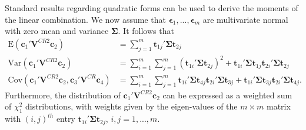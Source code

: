 \documentclass[12pt]{article}
\newcommand{\E}{\text{E}}
\newcommand{\Cov}{\text{Cov}}
\newcommand{\Var}{\text{Var}}
\newcommand{\bm}{\mathbf}
\newcommand{\bs}{\boldsymbol}
\begin{document}
Standard results regarding quadratic forms can be used to derive the moments of the linear combination. We now assume that $\bs\epsilon_1,...,\bs\epsilon_m$ are multivariate normal with zero mean and variance $\bs\Sigma$. It follows that 
\begin{align}
\label{eq:CRVE_expectation}
\E\left(\bm{c}_1' \bm{V}^{CR2} \bm{c}_2\right) &= \sum_{j=1}^m \bm{t}_{1j}' \bs\Sigma \bm{t}_{2j} \\
\label{eq:CRVE_variance}
\Var\left(\bm{c}_1' \bm{V}^{CR2} \bm{c}_2\right) &= \sum_{i=1}^m \sum_{j=1}^m \left(\bm{t}_{1i}' \bs\Sigma \bm{t}_{2j}\right)^2 + \bm{t}_{1i}' \bs\Sigma \bm{t}_{1j} \bm{t}_{2i}' \bs\Sigma \bm{t}_{2j} \\
\label{eq:CRVE_covariance}
\Cov\left(\bm{c}_1' \bm{V}^{CR2} \bm{c}_2, \bm{c}_3' \bm{V}^{CR} \bm{c}_4\right) &= \sum_{i=1}^m \sum_{j=1}^m \bm{t}_{1i}' \bs\Sigma \bm{t}_{4j} \bm{t}_{2i}' \bs\Sigma \bm{t}_{3j} + \bm{t}_{1i}' \bs\Sigma \bm{t}_{3j} \bm{t}_{2i}' \bs\Sigma \bm{t}_{4j}.
\end{align}
Furthermore, the distribution of $\bm{c}_1' \bm{V}^{CR2} \bm{c}_2$ can be expressed as a weighted sum of $\chi^2_1$ distributions, with weights given by the eigen-values of the $m \times m$ matrix with $\left(i,j\right)^{th}$ entry $\bm{t}_{1i}' \bs\Sigma \bm{t}_{2j}$, $i,j=1,...,m$.











\end{document}
